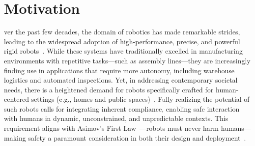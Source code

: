 \section{Motivation}\label{sec:introduction:motivation}

ver the past few decades, the domain of robotics has made remarkable strides, leading to the widespread adoption of high-performance, precise, and powerful rigid robots~\citep{todd1996fundamentals}. While these systems have traditionally excelled in manufacturing environments with repetitive tasks—such as assembly lines—they are increasingly finding use in applications that require more autonomy, including warehouse logistics and automated inspections. Yet, in addressing contemporary societal needs, there is a heightened demand for robots specifically crafted for human-centered settings (e.g., homes and public spaces)~\citep{nahavandi2019industry, chibani2013ubiquitous, royakkers2015literature, he2021challenges}. Fully realizing the potential of such robots calls for integrating inherent compliance, enabling safe interaction with humans in dynamic, unconstrained, and unpredictable contexts. This requirement aligns with Asimov’s First Law~\citep{asimov1941three}—robots must never harm humans—making safety a paramount consideration in both their design and deployment~\citep{villani2018survey}.


